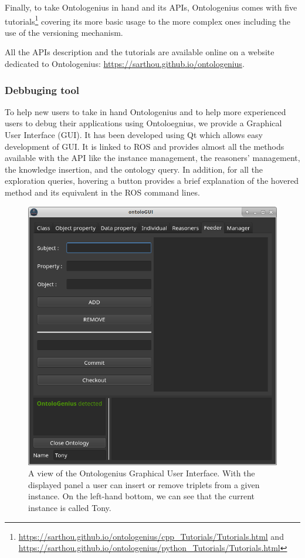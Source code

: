 Finally, to take Ontologenius in hand and its APIs, Ontologenius comes with five tutorials\footnote{\url{https://sarthou.github.io/ontologenius/cpp_Tutorials/Tutorials.html} and \url{https://sarthou.github.io/ontologenius/python_Tutorials/Tutorials.html}} covering its more basic usage to the more complex ones including the use of the versioning mechanism.

All the APIs description and the tutorials are available online on a website dedicated to Ontologenius: \url{https://sarthou.github.io/ontologenius}.

\subsubsection{Debbuging tool}

To help new users to take in hand Ontologenius and to help more experienced users to debug their applications using Ontoloegnius, we provide a Graphical User Interface (GUI). It has been developed using Qt which allows easy development of GUI. It is linked to ROS and provides almost all the methods available with the API like the instance management, the reasoners' management, the knowledge insertion, and the ontology query. In addition, for all the exploration queries, hovering a button provides a brief explanation of the hovered method and its equivalent in the ROS command lines.

\begin{figure}[ht!]
\centering
\includegraphics[scale=0.5]{figures/chapter2/ontologui.png}
\caption{\label{fig:chap2_ontologui} A view of the Ontologenius Graphical User Interface. With the displayed panel a user can insert or remove triplets from a given instance. On the left-hand bottom, we can see that the current instance is called Tony.}
\end{figure}

